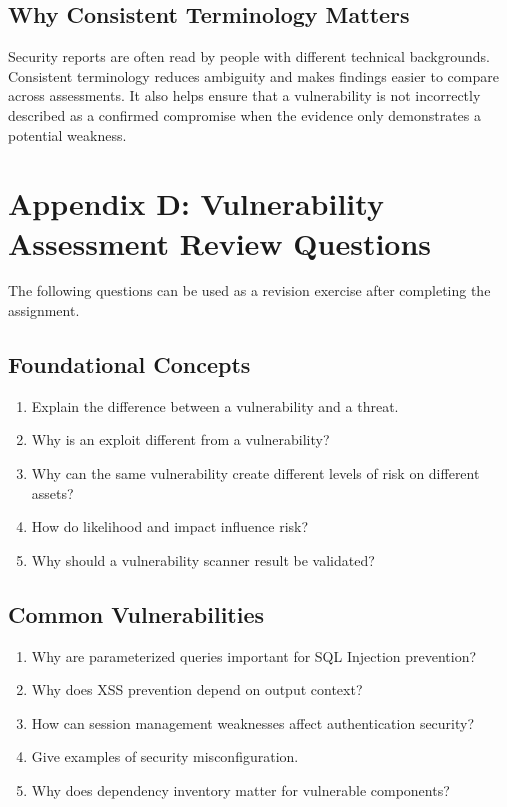 \documentclass[11pt,a4paper]{article}
\begin{document}
\subsection{Why Consistent Terminology Matters}
Security reports are often read by people with different technical backgrounds. Consistent terminology reduces ambiguity and makes findings easier to compare across assessments. It also helps ensure that a vulnerability is not incorrectly described as a confirmed compromise when the evidence only demonstrates a potential weakness.

\newpage
\section{Appendix D: Vulnerability Assessment Review Questions}
The following questions can be used as a revision exercise after completing the assignment.

\subsection{Foundational Concepts}
\begin{enumerate}
\item Explain the difference between a vulnerability and a threat.
\item Why is an exploit different from a vulnerability?
\item Why can the same vulnerability create different levels of risk on different assets?
\item How do likelihood and impact influence risk?
\item Why should a vulnerability scanner result be validated?
\end{enumerate}

\subsection{Common Vulnerabilities}
\begin{enumerate}
\item Why are parameterized queries important for SQL Injection prevention?
\item Why does XSS prevention depend on output context?
\item How can session management weaknesses affect authentication security?
\item Give examples of security misconfiguration.
\item Why does dependency inventory matter for vulnerable components?
\end{enumerate}
\end{document}
